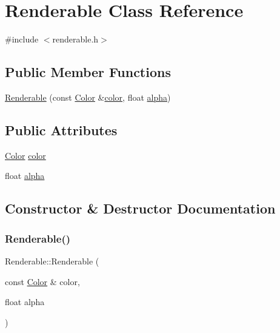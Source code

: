 \hypertarget{classRenderable}{}\section{Renderable Class Reference}
\label{classRenderable}


{\ttfamily \#include $<$renderable.\+h$>$}

\subsection*{Public Member Functions}
\begin{DoxyCompactItemize}
\item 
\hyperlink{classRenderable_a94704852e58e5ed5e7f2e3b62d9adfa6}{Renderable} (const \hyperlink{renderable_8h_a81c9947aa4cb6db0d6522d01e75e6c30}{Color} \&\hyperlink{classRenderable_ab39951f26a0f7bbd73a2328ad8a732d6}{color}, float \hyperlink{classRenderable_a0776ee977fd4f79aa9e24616c39abb2d}{alpha})
\end{DoxyCompactItemize}
\subsection*{Public Attributes}
\begin{DoxyCompactItemize}
\item 
\hyperlink{renderable_8h_a81c9947aa4cb6db0d6522d01e75e6c30}{Color} \hyperlink{classRenderable_ab39951f26a0f7bbd73a2328ad8a732d6}{color}
\item 
float \hyperlink{classRenderable_a0776ee977fd4f79aa9e24616c39abb2d}{alpha}
\end{DoxyCompactItemize}


\subsection{Constructor \& Destructor Documentation}
\mbox{\label{classRenderable_a94704852e58e5ed5e7f2e3b62d9adfa6}} 
\subsubsection{\texorpdfstring{Renderable()}{Renderable()}}
{\footnotesize\ttfamily Renderable\+::\+Renderable (\begin{DoxyParamCaption}\item[{const \hyperlink{renderable_8h_a81c9947aa4cb6db0d6522d01e75e6c30}{Color} \&}]{color,  }\item[{float}]{alpha }\end{DoxyParamCaption})\hspace{0.3cm}{\ttfamily [inline]}}



